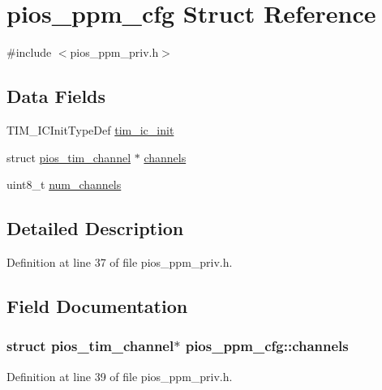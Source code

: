 \hypertarget{structpios__ppm__cfg}{\section{pios\-\_\-ppm\-\_\-cfg \-Struct \-Reference}
\label{structpios__ppm__cfg}
}


{\ttfamily \#include $<$pios\-\_\-ppm\-\_\-priv.\-h$>$}

\subsection*{\-Data \-Fields}
\begin{DoxyCompactItemize}
\item 
\-T\-I\-M\-\_\-\-I\-C\-Init\-Type\-Def \hyperlink{structpios__ppm__cfg_acecc33ca315a3edeb437b6073c1ec1b5}{tim\-\_\-ic\-\_\-init}
\item 
struct \hyperlink{structpios__tim__channel}{pios\-\_\-tim\-\_\-channel} $\ast$ \hyperlink{structpios__ppm__cfg_aab1a082565bf1af04ab81068736b569d}{channels}
\item 
uint8\-\_\-t \hyperlink{structpios__ppm__cfg_a2b60f6cdabad556a4de0d2617cfe3309}{num\-\_\-channels}
\end{DoxyCompactItemize}


\subsection{\-Detailed \-Description}


\-Definition at line 37 of file pios\-\_\-ppm\-\_\-priv.\-h.



\subsection{\-Field \-Documentation}
\hypertarget{structpios__ppm__cfg_aab1a082565bf1af04ab81068736b569d}{
\subsubsection[{channels}]{\setlength{\rightskip}{0pt plus 5cm}struct {\bf pios\-\_\-tim\-\_\-channel}$\ast$ {\bf pios\-\_\-ppm\-\_\-cfg\-::channels}}}\label{structpios__ppm__cfg_aab1a082565bf1af04ab81068736b569d}


\-Definition at line 39 of file pios\-\_\-ppm\-\_\-priv.\-h.

